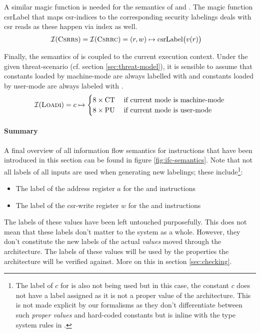 A similar magic function is needed for the semantics of  and .
The magic function \mbox{csrLabel} that maps \gls{csr}-indices to the corresponding security labelings deals with \gls{csr} reads as these happen via index as well.
\begin{align*}
    \mathcal{I}(\textsc{Csrrs}) = \mathcal{I}(\textsc{Csrrc}) &= (r, w) \mapsto \text{csrLabel}\big(v(r) \big)
\end{align*}

Finally, the semantics of  is coupled to the current execution context.
Under the given threat-scenario (cf. section \ref{sec:threat-model}), it is sensible to assume that constants loaded by machine-mode are always labelled with \CT{} and constants loaded by user-mode are always labeled with \PU{}.
\begin{equation*}
    \mathcal{I}(\textsc{Loadi}) = c \mapsto \begin{cases}
        8 \times \text{CT} & \; \text{if current mode is machine-mode} \\
        8 \times \text{PU} & \; \text{if current mode is user-mode}
    \end{cases}
\end{equation*}

\paragraph{Summary}
A final overview of all information flow semantics for instructions that have been introduced in this section can be found in figure \ref{fig:ifc-semantics}.
Note that not all labels of all inputs are used when generating new labelings; these include\footnote{%
    The label of $ c $ for  is also not being used but in this case, the constant $ c $ does not have a label assigned as it is not a proper value of the architecture.
    This is not made explicit by our formalisms as they don't differentiate between such \textit{proper values} and hard-coded constants but is inline with the type system rules in \cite{Ferraiuolo17}.
}:
\begin{itemize}
    \item The label of the address register $ a $ for the  and  instructions
    \item The label of the \gls{csr}-write register $ w $ for the  and  instructions
\end{itemize}

The labels of these values have been left untouched purposefully.
This does not mean that these labels don't matter to the system as a whole.
However, they don't constitute the new labels of the actual \textit{values} moved through the architecture.
The labels of these values will be used by the properties the architecture will be verified against.
More on this in section \ref{sec:checking}.

